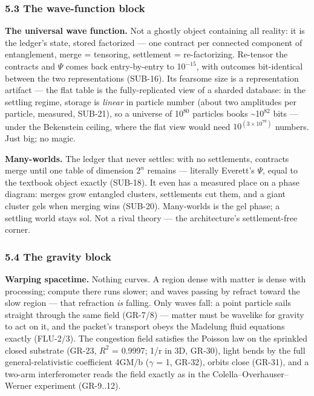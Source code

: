 \documentclass[
  11pt,
]{article}
\begin{document}
\subsubsection{5.3 The wave-function
block}\label{the-wave-function-block}

\textbf{The universal wave function.} Not a ghostly object containing
all reality: it is the ledger's state, stored factorized --- one
contract per connected component of entanglement, merge = tensoring,
settlement = re-factorizing. Re-tensor the contracts and $\Psi$ comes back
entry-by-entry to 1$0^{-15}$, with outcomes bit-identical between the two
representations (SUB-16). Its fearsome size is a representation artifact
--- the flat table is the fully-replicated view of a sharded database:
in the settling regime, storage is \emph{linear} in particle number
(about two amplitudes per particle, measured, SUB-21), so a universe of
1$0^{80}$ particles books \textasciitilde1$0^{82}$ bits --- under the Bekenstein
ceiling, where the flat view would need $10^{(3\times 10^{79})}$ numbers. Just
big; no magic.

\textbf{Many-worlds.} The ledger that never settles: with no
settlements, contracts merge until one table of dimension $2^n$ remains ---
literally Everett's $\Psi$, equal to the textbook object exactly (SUB-18). It
even has a measured place on a phase diagram: merges grow entangled
clusters, settlements cut them, and a giant cluster gels when merging
wins (SUB-20). Many-worlds is the gel phase; a settling world stays sol.
Not a rival theory --- the architecture's settlement-free corner.

\subsubsection{5.4 The gravity block}\label{the-gravity-block}

\textbf{Warping spacetime.} Nothing curves. A region dense with matter
is dense with processing; compute there runs slower; and waves passing
by refract toward the slow region --- that refraction \emph{is} falling.
Only waves fall: a point particle sails straight through the same field
(GR-7/8) --- matter must be wavelike for gravity to act on it, and the
packet's transport obeys the Madelung fluid equations exactly (FLU-2/3).
The congestion field satisfies the Poisson law on the sprinkled closed
substrate (GR-23, $R^2$ = 0.9997; 1/r in 3D, GR-30), light bends by the
full general-relativistic coefficient 4GM/b ($\gamma$ = 1, GR-32), orbits close
(GR-31), and a two-arm interferometer reads the field exactly as in the
Colella--Overhauser--Werner experiment (GR-9..12).
\end{document}
